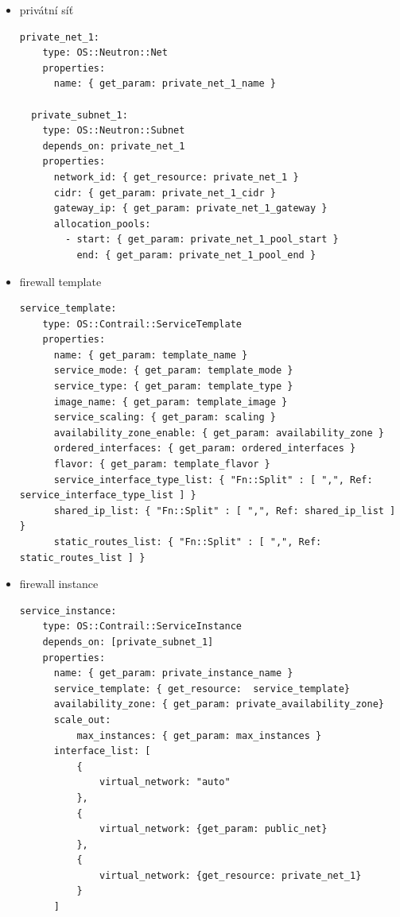 \begin{itemize}

\item privátní síť


\begin{lstlisting}[caption=Privátní síť]
  private_net_1:
    type: OS::Neutron::Net
    properties:
      name: { get_param: private_net_1_name } 

  private_subnet_1:
    type: OS::Neutron::Subnet
    depends_on: private_net_1
    properties:
      network_id: { get_resource: private_net_1 }
      cidr: { get_param: private_net_1_cidr }
      gateway_ip: { get_param: private_net_1_gateway }
      allocation_pools:
        - start: { get_param: private_net_1_pool_start }
          end: { get_param: private_net_1_pool_end }
\end{lstlisting}


\item firewall template


\begin{lstlisting}[caption=Firewall servisní instance]
service_template:
    type: OS::Contrail::ServiceTemplate
    properties:
      name: { get_param: template_name }
      service_mode: { get_param: template_mode }
      service_type: { get_param: template_type }
      image_name: { get_param: template_image }
      service_scaling: { get_param: scaling }
      availability_zone_enable: { get_param: availability_zone }
      ordered_interfaces: { get_param: ordered_interfaces }
      flavor: { get_param: template_flavor }
      service_interface_type_list: { "Fn::Split" : [ ",", Ref: service_interface_type_list ] }
      shared_ip_list: { "Fn::Split" : [ ",", Ref: shared_ip_list ] }
      static_routes_list: { "Fn::Split" : [ ",", Ref: static_routes_list ] }

\end{lstlisting}

\item firewall instance
\begin{lstlisting}[caption=Privátní síť]
 service_instance:
    type: OS::Contrail::ServiceInstance
    depends_on: [private_subnet_1]
    properties:
      name: { get_param: private_instance_name }
      service_template: { get_resource:  service_template}
      availability_zone: { get_param: private_availability_zone}
      scale_out: 
          max_instances: { get_param: max_instances }
      interface_list: [
          {
              virtual_network: "auto"
          },
          {
              virtual_network: {get_param: public_net}
          },
          {
              virtual_network: {get_resource: private_net_1}
          }
      ]
\end{lstlisting}



\end{itemize}
